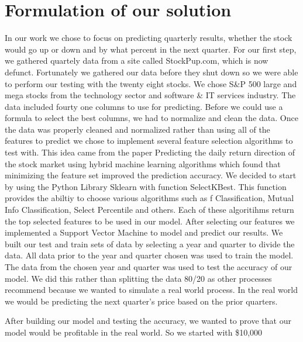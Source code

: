 \documentclass[conference]{IEEEtran}
\begin{document}
\section{Formulation of our solution}
In our work we chose to focus on predicting quarterly results, whether the stock would go up or down and by what percent in the next quarter.  For our first step, we gathered quartely data from a site called StockPup.com, which is now defunct. Fortunately we gathered our data before they shut down so we were able to perform our testing with the twenty eight stocks. We chose S\&P 500 large and mega stocks from the technology sector and software \& IT services industry.  The data included fourty one columns to use for predicting.  Before we could use a formula to select the best columns, we had to normalize and clean the data. 
Once the data was properly cleaned and normalized rather than using all of the features to predict we chose to implement several feature selection algorithms to test with.  This idea came from the paper Predicting the daily return direction of the stock market using hybrid machine learning algorithms \cite{DailyReturnDirection} which found that minimizing the feature set improved the prediction accuracy.  We decided to start by using the Python Library Sklearn with function SelectKBest.  This function provides the abiltiy to choose various algorithms such as f Classification, Mutual Info Classification, Select Percentile and others.  Each of these algoritihms return the top selected features to be used in our model.  After selecting our features we implemented a Support Vector Machine to model and predict our results.  We built our test and train sets of data by selecting a year and quarter to divide the data.  All data prior to the year and quarter chosen was used to train the model. The data from the chosen year and quarter was used to test the accuracy of our model.  We did this rather than splitting the data 80/20 as other processes recommend because we wanted to simulate a real world process.  In the real world we would be predicting the next quarter's price based on the prior quarters.  

After building our model and testing the accuracy, we wanted to prove that our model would be profitable in the real world.  So we started with \$10,000 
\end{document}
